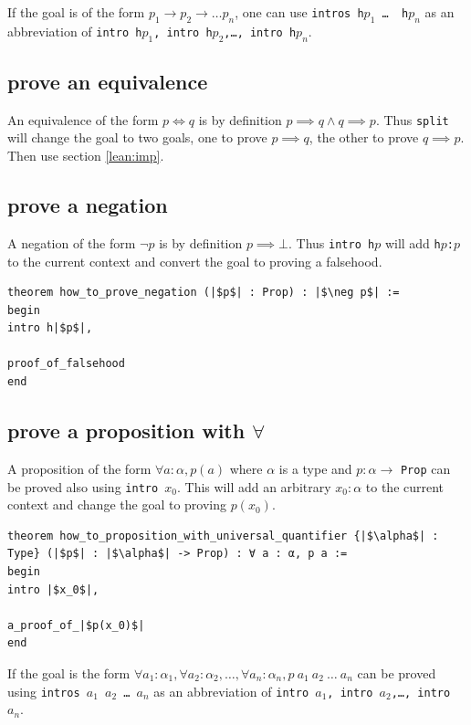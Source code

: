 \documentclass{report}
\theoremstyle{definition}
\begin{document}
If the goal is of the form $p_1\to p_2\to\dots p_n$, one can use {\tt \small intros h$p_1$ \dots\, h$p_n$} as an abbreviation of {\tt \small intro h$p_1$, intro h$p_2$,\dots, intro h$p_n$}.


\subsection{prove an equivalence}\label{lean:eqv}
An equivalence of the form $p \iff q$ is by definition $p\implies q \land q\implies p$. Thus {\tt \small split} will change the goal to two goals, one to prove $p\implies q$, the other to prove $q \implies p$. Then use section \ref{lean:imp}.

\subsection{prove a negation}
A negation of the form $\neg p$ is by definition $p \implies \bot$. Thus {\tt \small intro h$p$} will add {\tt \small h$p$:$p$} to the current context and convert the goal to proving a falsehood.

\begin{verbatim}
theorem how_to_prove_negation (|$p$| : Prop) : |$\neg p$| :=
begin
intro h|$p$|,

proof_of_falsehood
end
\end{verbatim}

\subsection{prove a proposition with $\forall$}\label{lean:forall}
A proposition of the form $\forall a : \alpha, p(a)$ where $\alpha$ is a type and $p : \alpha\to$ {\tt \small Prop} can be proved also using {\tt \small intro $x_0$}. This will add an arbitrary $x_0:\alpha$ to the current context and change the goal to proving $p(x_0)$.

\begin{verbatim}
theorem how_to_proposition_with_universal_quantifier {|$\alpha$| : Type} (|$p$| : |$\alpha$| -> Prop) : ∀ a : α, p a :=
begin
intro |$x_0$|,

a_proof_of_|$p(x_0)$|
end
\end{verbatim}

If the goal is the form $\forall a_1:\alpha_1,\forall a_2:\alpha_2,\dots,\forall a_n:\alpha_n, p\ a_1\ a_2\ \dots\ a_n$ can be proved using {\tt \small intros $a_1$ $a_2$ \dots\  $a_n$} as an abbreviation of {\tt \small intro $a_1$, intro $a_2$,\dots, intro $a_n$}.
\end{document}
